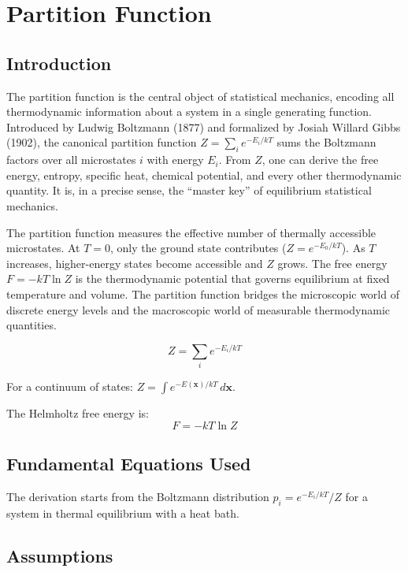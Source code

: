 \chapter{Partition Function}

\section*{Introduction}

The partition function is the central object of statistical mechanics, encoding all thermodynamic information about a system in a single generating function. Introduced by Ludwig Boltzmann (1877) and formalized by Josiah Willard Gibbs (1902), the canonical partition function $Z = \sum_{i} e^{-E_{i}/kT}$ sums the Boltzmann factors over all microstates $i$ with energy $E_{i}$. From $Z$, one can derive the free energy, entropy, specific heat, chemical potential, and every other thermodynamic quantity. It is, in a precise sense, the ``master key'' of equilibrium statistical mechanics.

The partition function measures the effective number of thermally accessible microstates. At $T = 0$, only the ground state contributes ($Z = e^{-E_{0}/kT}$). As $T$ increases, higher-energy states become accessible and $Z$ grows. The free energy $F = -kT\ln Z$ is the thermodynamic potential that governs equilibrium at fixed temperature and volume. The partition function bridges the microscopic world of discrete energy levels and the macroscopic world of measurable thermodynamic quantities.


\begin{equation}
\boxed{\; Z = \sum_{i} e^{-E_{i}/kT}\;}
\label{eq:partition-function}
\end{equation}

For a continuum of states: $Z = \int e^{-E(\mathbf{x})/kT}\,d\mathbf{x}$.

The Helmholtz free energy is:
\begin{equation}
F = -kT\ln Z
\label{eq:free-energy}
\end{equation}

\section*{Fundamental Equations Used}

The derivation starts from the Boltzmann distribution $p_i = e^{-E_i/kT}/Z$ for a system in thermal equilibrium with a heat bath.

\section*{Assumptions}

